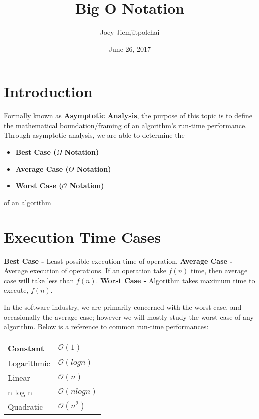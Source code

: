 \documentclass{article}
\title{Big O Notation}
\author{Joey Jiemjitpolchai }
\date{June 26, 2017}
\newcommand{\bigO}{\mathcal{O}}
\begin{document}
    \maketitle

    \section{Introduction}
        Formally known as \textbf{Asymptotic Analysis}, the purpose of this topic is to define the mathematical boundation/framing of an algorithm's run-time performance. Through asymptotic analysis, we are able to determine the
        \begin{itemize}
          \item \textbf{Best Case ($\Omega$  Notation)}
          \item \textbf{Average Case ($\Theta$ Notation)}
          \item \textbf{Worst Case ($\bigO$ Notation)}
        \end{itemize}
        of an algorithm
    \section{Execution Time Cases}
        \textbf{Best Case - }Least possible execution time of operation.\newline
        \textbf{Average Case - } Average execution of operations. If an operation take $f(n)$ time, then average case will take less than $f(n)$.\newline
        \textbf{Worst Case - } Algorithm takes maximum time to execute, $f(n)$.\newline
        
        In the software industry, we are primarily concerned with the worst case, and occasionally the average case; however we will mostly study the worst case of any algorithm. Below is a reference to common run-time performances:
        
        \begin{tabu} to 0.8\textwidth { | X[l] | X[c] | }
         \hline
         Constant & $\bigO(1)$ \\
         \hline
         Logarithmic  & $\bigO(log n)$ \\
        \hline
        Linear  & $\bigO(n)$ \\
        \hline
        n log n  & $\bigO(n log n)$ \\
        \hline
        Quadratic  & $\bigO(n^2)$ \\
        \hline
        \end{tabu}
    \newpage
\end{document}
